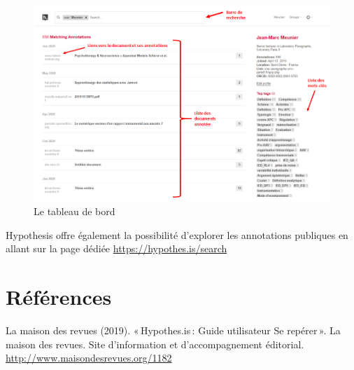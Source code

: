 \documentclass[
]{book}
\begin{document}
\begin{figure}
\centering
\includegraphics{img/dashboard.png}
\caption{Le tableau de bord}
\end{figure}

Hypothesis offre également la possibilité d'explorer les annotations publiques en allant sur la page dédiée \url{https://hypothes.is/search}

\hypertarget{ruxe9fuxe9rences}{%
\chapter*{Références}\label{ruxe9fuxe9rences}}

La maison des revues (2019). «\,Hypothes.is\,: Guide utilisateur Se repérer\,». La maison des revues. Site d'information et d'accompagnement éditorial. \url{http://www.maisondesrevues.org/1182}

\backmatter
  
\end{document}
